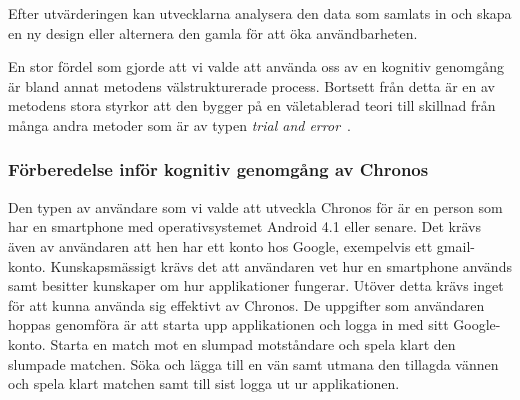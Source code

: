 \documentclass[a4paper, 11pt]{article}
\begin{document}
Efter utvärderingen kan utvecklarna analysera den data som samlats in och skapa en ny design eller alternera den gamla för att öka användbarheten.


En stor fördel som gjorde att vi valde att använda oss av en kognitiv genomgång är bland annat metodens välstrukturerade process. Bortsett från detta är en av metodens stora styrkor att den bygger på en väletablerad teori till skillnad från många andra metoder som är av typen \textit{trial and error}~\cite[sid 230-231]{benyon2010designing}.


\subsubsection{Förberedelse inför kognitiv genomgång av Chronos} \label{kog}
Den typen av användare som vi valde att utveckla Chronos för är en person som har en smartphone med operativsystemet Android 4.1 eller senare. Det krävs även av användaren att hen har ett konto hos Google, exempelvis ett gmail-konto. Kunskapsmässigt krävs det att användaren vet hur en smartphone används samt besitter kunskaper om hur applikationer fungerar. Utöver detta krävs inget för att kunna använda sig effektivt av Chronos.
De uppgifter som användaren hoppas genomföra är att starta upp applikationen och logga in med sitt Google-konto. Starta en match mot en slumpad motståndare och spela klart den slumpade matchen. Söka och lägga till en vän samt utmana den tillagda vännen och spela klart matchen samt till sist logga ut ur applikationen.
\end{document}
